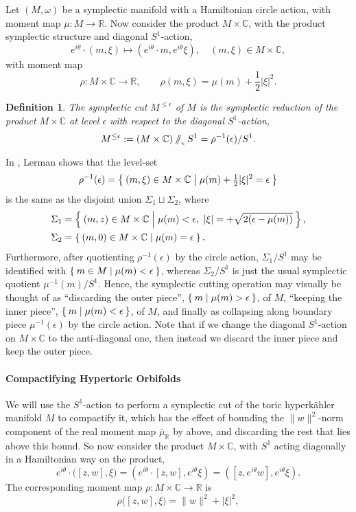 \documentclass{amsart}
\newtheorem{defn}[theorem]{Definition\rm}
\newcommand{\ra}{\rightarrow}
\newcommand{\w}{\omega}
\newcommand{\e}{\epsilon}
\newcommand{\RR}{\mathbb{R}}
\newcommand{\CC}{\mathbb{C}}
\newcommand{\sslash}{\mathbin{/\mkern-6mu/}}
\begin{document}
	Let $(M,\w)$ be a symplectic manifold with a Hamiltonian circle action, with moment map $\mu : M \ra \RR$. Now consider the product $M \times \CC$, with the product symplectic structure and diagonal $S^{1}$-action,
	\[
		e^{i\theta} \cdot (m, \xi) \longmapsto (e^{i\theta} \cdot m, e^{i\theta}\xi), \quad (m,\xi) \in M \times \CC,
	\]
	with moment map
	\[
		\rho : M \times \CC \ra \RR, \qquad \rho(m,\xi) = \mu(m) + \frac{1}{2}|\xi|^{2}.
	\]
	
	\begin{defn}
		The \emph{symplectic cut} $M^{\leq\e}$ of $M$ is the symplectic reduction of the product $M \times \CC$ at level $\e$ with respect to the diagonal $S^{1}$-action,
		\[
			M^{\leq\e} := (M \times \CC) \sslash_{\e} S^{1} = \rho^{-1}(\e)/S^{1}.
		\]
	\end{defn}
	
	In \cite{Ler95}, Lerman shows that the level-set
	\[
		\rho^{-1}(\e) = \Set{(m, \xi) \in M \times \CC | \mu(m) + \tfrac{1}{2}|\xi|^{2} = \e}
	\]
	is the same as the disjoint union $\Sigma_{1} \sqcup \Sigma_{2}$, where
	\begin{align*}
		\Sigma_{1} &= \Set{(m,z) \in M \times \CC | \mu(m) < \e,\ |\xi| = + \sqrt{2(\e - \mu(m))} }, \\
		\Sigma_{2} &= \Set{(m,0) \in M \times \CC | \mu(m) = \e}.
	\end{align*}
	Furthermore, after quotienting $\rho^{-1}(\e)$ by the circle action, $\Sigma_{1}/S^{1}$ may be identified with $\Set{m \in M | \mu(m) < \e}$, whereas $\Sigma_{2}/S^{1}$ is just the usual symplectic quotient $\mu^{-1}(m)/S^{1}$. Hence, the symplectic cutting operation may visually be thought of as ``discarding the outer piece'', $\Set{m | \mu(m) > \e}$, of $M$, ``keeping the inner piece'', $\Set{ m | \mu(m) < \e}$, of $M$, and finally as collapsing along boundary piece $\mu^{-1}(\e)$ by the circle action. Note that if we change the diagonal $S^{1}$-action on $M \times \CC$ to the anti-diagonal one, then instead we discard the inner piece and keep the outer piece.
	
	
	
	\paragraph{Compactifying Hypertoric Orbifolds}
	
	We will use the $S^{1}$-action to perform a symplectic cut of the toric hyperk\"ahler manifold $M$ to compactify it, which has the effect of bounding the $\|w\|^{2}$-norm component of the real moment map $\bar{\mu}_{\RR}$ by above, and discarding the rest that lies above this bound. So now consider the product $M \times \CC$, with $S^{1}$ acting diagonally in a Hamiltonian way on the product,
	$$
	e^{i\theta} \cdot \big( [z,w], \xi   \big) = \left( e^{i\theta} \cdot [z,w], e^{i\theta}\xi\right) = \left( [z,e^{i\theta}w], e^{i\theta}\xi\right).
	$$
	The corresponding moment map $\rho : M \times \CC \ra \RR$ is
	\[
	\rho\big( [z,w], \xi  \big) = \|w\|^{2} + |\xi|^{2},
	\]
	
\end{document}
